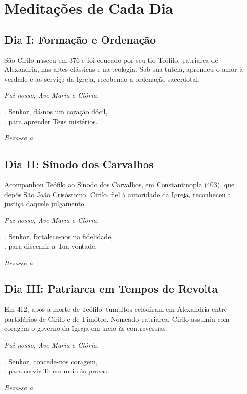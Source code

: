 \documentclass[18pt]{article}
\makeatletter
\newcommand{\vers@resp@sym}{%
  \raisebox{0.2ex}{\rotatebox[origin=c]{-20}{$\m@th\rceil$}}%
}
\newcommand{\vers@resp}[2]{%
  {\ooalign{%
     \hidewidth\kern#1\vers@resp@sym\hidewidth\cr
     #2\cr
  }}%
}
\DeclareRobustCommand{\versicle}{\vers@resp{-0.1em}{V}}
\DeclareRobustCommand{\response}{\vers@resp{0pt}{R}}
\makeatother
\begin{document}
\newpage

\section{Meditações de Cada Dia}

\subsection*{Dia I: Formação e Ordenação}
\begin{justify}
São Cirilo nasceu em 376 e foi educado por seu tio Teófilo, patriarca de Alexandria, nas artes clássicas e na teologia. Sob sua tutela, aprendeu o amor à verdade e ao serviço da Igreja, recebendo a ordenação sacerdotal.

\vspace{0.3cm}
\textit{Pai-nosso, Ave-Maria e Glória.}

\noindent
\versicle. Senhor, dá-nos um coração dócil,\\
\response. para aprender Teus mistérios.

\textit{Reza-se a }
\end{justify}

\subsection*{Dia II: Sínodo dos Carvalhos}
\begin{justify}
Acompanhou Teófilo ao Sínodo dos Carvalhos, em Constantinopla (403), que depôs São João Crisóstomo. Cirilo, fiel à autoridade da Igreja, reconheceu a justiça daquele julgamento.

\vspace{0.3cm}
\textit{Pai-nosso, Ave-Maria e Glória.}

\noindent
\versicle. Senhor, fortalece-nos na fidelidade,\\
\response. para discernir a Tua vontade.

\textit{Reza-se a }
\end{justify}

\subsection*{Dia III: Patriarca em Tempos de Revolta}
\begin{justify}
Em 412, após a morte de Teófilo, tumultos eclodiram em Alexandria entre partidários de Cirilo e de Timóteo. Nomeado patriarca, Cirilo assumiu com coragem o governo da Igreja em meio às controvérsias.

\vspace{0.3cm}
\textit{Pai-nosso, Ave-Maria e Glória.}

\noindent
\versicle. Senhor, concede-nos coragem,\\
\response. para servir-Te em meio às provas.

\textit{Reza-se a }
\end{justify}
\end{document}
